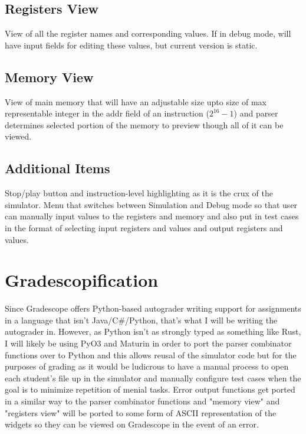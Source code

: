 \documentclass{article}
\begin{document}
\subsection{Registers View}
View of all the register names and corresponding values. If in debug mode, will have input fields for editing these values, but current version is static.
\subsection{Memory View}
View of main memory that will have an adjustable size upto size of max representable integer in the addr field of an instruction ($2^16-1$) and parser determines selected portion of the memory to preview though all of it can be viewed.

\subsection{Additional Items}
Stop/play button and instruction-level highlighting as it is the crux of the simulator. Menu that switches between Simulation and Debug mode so that user can manually input values to the registers and memory and also put in test cases in the format of selecting input registers and values and output registers and values.


\section{Gradescopification}
Since Gradescope offers Python-based autograder writing support for assignments in a language that isn't Java/C\#/Python, that's what I will be writing the autograder in. However, as Python isn't as strongly typed as something like Rust, I will likely be using PyO3 and Maturin in order to port the parser combinator functions over to Python and this allows reusal of the simulator code but for the purposes of grading as it would be ludicrous to have a manual process to open each student's file up in the simulator and manually configure test cases when the goal is to minimize repetition of menial tasks. Error output functions get ported in a similar way to the parser combinator functions and "memory view" and "registers view" will be ported to some form of ASCII representation of the widgets so they can be viewed on Gradescope in the event of an error. 
\end{document}
